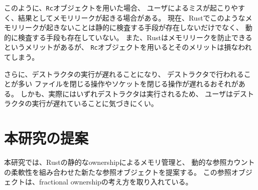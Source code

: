 \documentclass{sumiilab-paper}
\theoremstyle{mystyle}
\numberwithin{definition}{chapter} %
\begin{document}
このように、\texttt{Rc}オブジェクトを用いた場合、
ユーザによるミスが起こりやすく、結果としてメモリリークが起きる場合がある。
現在、Rustでこのようなメモリリークが起きないことは静的に検査する手段が存在しないだけでなく、
動的に検査する手段も存在していない。
また、Rustはメモリリークを防止できるというメリットがあるが、
\texttt{Rc}オブジェクトを用いるとそのメリットは損なわれてしまう。

さらに、デストラクタの実行が遅れることになり、
デストラクタで行われることが多い
ファイルを閉じる操作やソケットを閉じる操作が遅れるおそれがある。
しかも、実際にはいずれデストラクタは実行されるため、
ユーザはデストラクタの実行が遅れていることに気づきにくい。

\chapter{本研究の提案}
本研究では、Rustの静的なownershipによるメモリ管理と、
動的な参照カウントの柔軟性を組み合わせた新たな参照オブジェクトを提案する。
この参照オブジェクトは、fractional ownershipの考え方を取り入れている。
\end{document}
